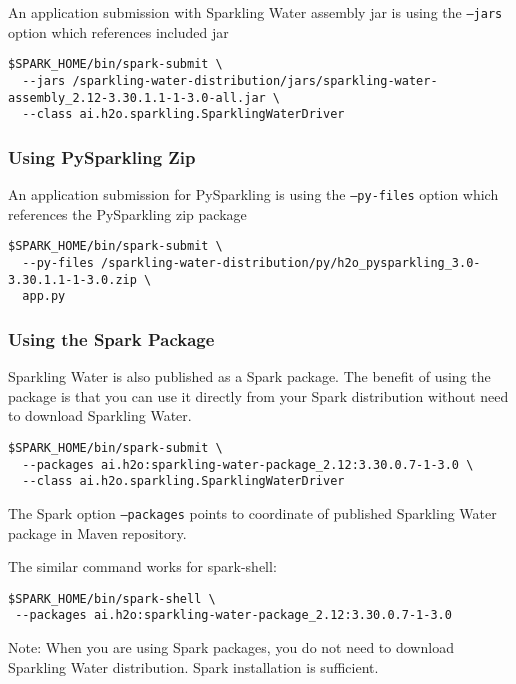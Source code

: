 An application submission with Sparkling Water assembly jar is using the \texttt{--jars} option which references included jar

\pagebreak
\begin{lstlisting}[style=Bash]
$SPARK_HOME/bin/spark-submit \
  --jars /sparkling-water-distribution/jars/sparkling-water-assembly_2.12-3.30.1.1-1-3.0-all.jar \
  --class ai.h2o.sparkling.SparklingWaterDriver
\end{lstlisting}

\subsubsection{Using PySparkling Zip}
An application submission for PySparkling is using the \texttt{--py-files} option which references the PySparkling
zip package

\begin{lstlisting}[style=Bash]
$SPARK_HOME/bin/spark-submit \
  --py-files /sparkling-water-distribution/py/h2o_pysparkling_3.0-3.30.1.1-1-3.0.zip \
  app.py
\end{lstlisting}

\subsubsection{Using the Spark Package}

Sparkling Water is also published as a Spark package. The benefit of using the package is that you can use it directly
from your Spark distribution without need to download Sparkling Water.

\begin{lstlisting}[style=Bash]
$SPARK_HOME/bin/spark-submit \
  --packages ai.h2o:sparkling-water-package_2.12:3.30.0.7-1-3.0 \
  --class ai.h2o.sparkling.SparklingWaterDriver
\end{lstlisting}

The Spark option \texttt{--packages} points to coordinate of published Sparkling Water package in Maven repository.

The similar command works for spark-shell:

\begin{lstlisting}[style=Bash]
$SPARK_HOME/bin/spark-shell \
 --packages ai.h2o:sparkling-water-package_2.12:3.30.0.7-1-3.0
\end{lstlisting}

Note: When you are using Spark packages, you do not need to download Sparkling Water distribution. Spark installation is sufficient.

